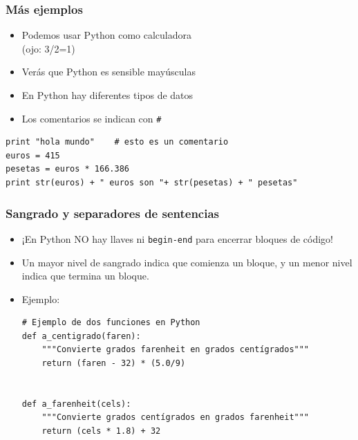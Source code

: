 \documentclass{beamer}
\begin{document}
\begin{frame}[fragile]

\frametitle{Más ejemplos}

\begin{itemize}
\item Podemos usar Python como calculadora\\
(ojo: 3/2=1)

\item Verás que Python es sensible mayúsculas

\item En Python hay diferentes tipos de datos

\item Los comentarios se indican con \verb=#=

\end{itemize}

\begin{footnotesize}
\begin{verbatim}
print "hola mundo"    # esto es un comentario
euros = 415
pesetas = euros * 166.386
print str(euros) + " euros son "+ str(pesetas) + " pesetas"
\end{verbatim}
\end{footnotesize}

\end{frame}



\begin{frame}[fragile]
\frametitle{Sangrado y separadores de sentencias}

\begin{itemize}
\item ¡En Python NO hay llaves ni \verb|begin-end| para encerrar bloques
  de código!
\item Un mayor nivel de sangrado indica que comienza un bloque,
  y un menor nivel indica que termina un bloque.
  
\item Ejemplo:

  \begin{footnotesize}
\begin{verbatim}
# Ejemplo de dos funciones en Python
def a_centigrado(faren):
    """Convierte grados farenheit en grados centígrados"""
    return (faren - 32) * (5.0/9)


def a_farenheit(cels):
    """Convierte grados centígrados en grados farenheit"""
    return (cels * 1.8) + 32
\end{verbatim}
  \end{footnotesize}
\end{itemize}
\end{frame}
\end{document}
